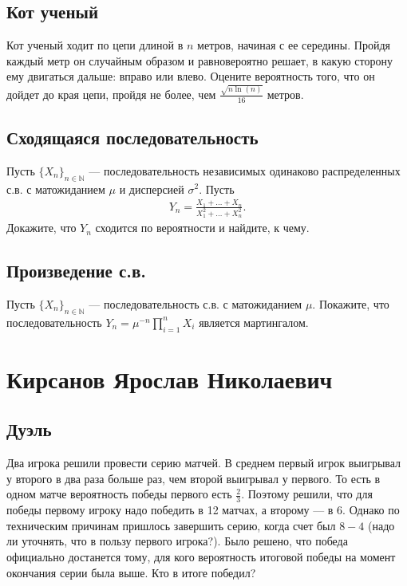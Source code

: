 \documentclass[12pt]{article}
\newcommand\N{\mathbb{N}}
\begin{document}
\subsection{Кот ученый}

Кот ученый ходит по цепи длиной в $n$ метров, начиная с ее середины. Пройдя каждый метр он случайным образом и равновероятно решает, в какую сторону ему двигаться дальше: вправо или влево. Оцените вероятность того, что он дойдет до края цепи, пройдя не более, чем $\frac{\sqrt{n \ln(n)}}{16}$ метров.



\subsection{Сходящаяся последовательность}

Пусть $\{X_n\}_{n \in \N}$ --- последовательность независимых одинаково распределенных с.в. с матожиданием $\mu$ и дисперсией $\sigma^2$. Пусть 
\begin{align*}
    Y_n = \frac{X_1 + \dots + X_n}{X_1^2 + \dots + X_n^2}.
\end{align*}
Докажите, что $Y_n$ сходится по вероятности и найдите, к чему.



\subsection{Произведение с.в.}

Пусть $\{X_n\}_{n \in \N}$ --- последовательность с.в. с матожиданием $\mu$. Покажите, что последовательность $Y_n = \mu^{-n} \prod_{i = 1}^n X_i$ является мартингалом.



\newpage
\section{Кирсанов Ярослав Николаевич}

\subsection{Дуэль}

Два игрока решили провести серию матчей. В среднем первый игрок выигрывал у второго в два раза больше раз, чем второй выигрывал у первого. То есть в одном матче вероятность победы первого есть $\frac{2}{3}$. Поэтому решили, что для победы первому игроку надо победить в 12 матчах, а второму --- в 6. Однако по техническим причинам пришлось завершить серию, когда счет был $8-4$ (надо ли уточнять, что в пользу первого игрока?). Было решено, что победа официально достанется тому, для кого вероятность итоговой победы на момент окончания серии была выше. Кто в итоге победил?
\end{document}
